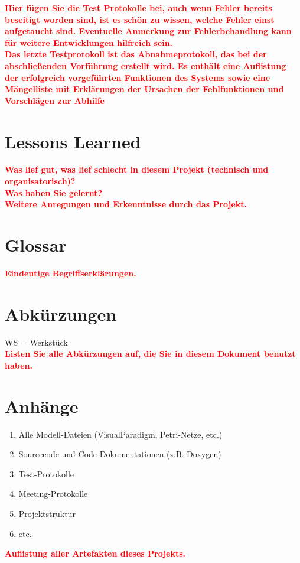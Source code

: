 \documentclass[oneside,a4paper,titlepage]{scrartcl} %
\begin{document}
\textcolor{red}{\textbf{Hier fügen Sie die Test Protokolle bei, auch wenn Fehler bereits beseitigt
worden sind, ist es schön zu wissen, welche Fehler einst aufgetaucht sind.
Eventuelle Anmerkung zur Fehlerbehandlung kann für weitere Entwicklungen hilfreich sein.\\
Das letzte Testprotokoll ist das Abnahmeprotokoll, das bei der abschließenden Vorführung erstellt
wird. Es enthält eine Auflistung der erfolgreich vorgeführten Funktionen des Systems sowie eine
Mängelliste mit Erklärungen der Ursachen der Fehlfunktionen und Vorschlägen zur Abhilfe}}

\section{Lessons Learned}
\textcolor{red}{\textbf{Was lief gut, was lief schlecht in diesem Projekt (technisch und organisatorisch)?\\
Was haben Sie gelernt?\\
Weitere Anregungen und Erkenntnisse durch das Projekt.}}

\newpage

\section{Glossar}
\textcolor{red}{\textbf{Eindeutige Begriffserklärungen.}}

\section{Abkürzungen}
WS = Werkstück\\
\textcolor{red}{\textbf{Listen Sie alle Abkürzungen auf, die Sie in diesem Dokument benutzt haben.}}

\section{Anhänge}
\begin{enumerate}
 \item Alle Modell-Dateien (VisualParadigm, Petri-Netze, etc.)
 \item Sourcecode und Code-Dokumentationen (z.B. Doxygen)
 \item Test-Protokolle
 \item Meeting-Protokolle
 \item Projektstruktur
 \item etc.
\end{enumerate}
\textcolor{red}{\textbf{Auflistung aller Artefakten dieses Projekts.}}
\end{document}
